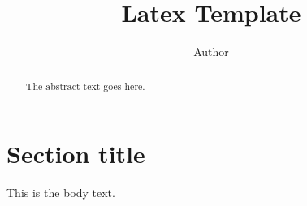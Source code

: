\documentclass{article}
\begin{document}
\title{Latex Template}
\author{Author}

\maketitle

\begin{abstract}
The abstract text goes here.
\end{abstract}

\section{Section title}
This is the body text.
\end{document}
